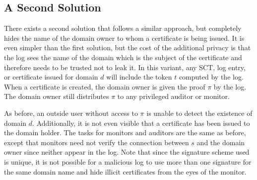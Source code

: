 \documentclass[letterpaper,twocolumn,10pt]{article}
\begin{document}
\subsection{A Second Solution}
There exists a second solution that follows a similar approach, but completely hides the name of the domain owner to whom a certificate is being issued. It is even simpler than the first solution, but the cost of the additional privacy is that the log sees the name of the domain which is the subject of the certificate and therefore needs to be trusted not to leak it. In this variant, any SCT, log entry, or certificate issued for domain $d$ will include the token $t$ computed by the log. When a certificate is created, the domain owner is given the proof $\pi$ by the log. The domain owner still distributes $\pi$ to any privileged auditor or monitor.

As before, an outside user without access to $\pi$ is unable to detect the existence of domain $d$. Additionally, it is not even visible that a certificate has been issued to the domain holder. The tasks for monitors and auditors are the same as before, except that monitors need not verify the connection between $s$ and the domain owner since neither appear in the log. Note that since the signature scheme used is unique, it is not possible for a malicious log to use more than one signature for the same domain name and hide illicit certificates from the eyes of the monitor. 
\end{document}
